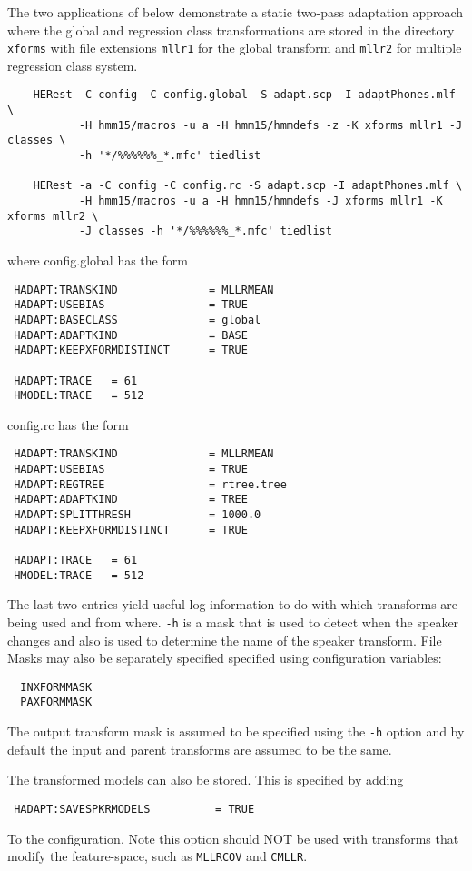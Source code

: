 The two applications of  below demonstrate a static two-pass 
adaptation approach where the global and regression class transformations are 
stored in the directory \texttt{xforms} with file extensions \texttt{mllr1}
for the global transform and \texttt{mllr2} for multiple regression class
system.
\begin{verbatim}
    HERest -C config -C config.global -S adapt.scp -I adaptPhones.mlf \
           -H hmm15/macros -u a -H hmm15/hmmdefs -z -K xforms mllr1 -J classes \
           -h '*/%%%%%%_*.mfc' tiedlist

    HERest -a -C config -C config.rc -S adapt.scp -I adaptPhones.mlf \
           -H hmm15/macros -u a -H hmm15/hmmdefs -J xforms mllr1 -K xforms mllr2 \
           -J classes -h '*/%%%%%%_*.mfc' tiedlist
\end{verbatim}
where config.global has the form
\begin{verbatim}
 HADAPT:TRANSKIND              = MLLRMEAN
 HADAPT:USEBIAS                = TRUE
 HADAPT:BASECLASS              = global
 HADAPT:ADAPTKIND              = BASE
 HADAPT:KEEPXFORMDISTINCT      = TRUE

 HADAPT:TRACE   = 61
 HMODEL:TRACE   = 512
\end{verbatim}
 config.rc has the form
\begin{verbatim}
 HADAPT:TRANSKIND              = MLLRMEAN
 HADAPT:USEBIAS                = TRUE
 HADAPT:REGTREE                = rtree.tree
 HADAPT:ADAPTKIND              = TREE
 HADAPT:SPLITTHRESH            = 1000.0
 HADAPT:KEEPXFORMDISTINCT      = TRUE

 HADAPT:TRACE   = 61
 HMODEL:TRACE   = 512
\end{verbatim}
The last two entries yield useful log information to do with which
transforms are being used and from where.  \texttt{-h} is a mask that
is used to detect when the speaker changes and also is used to
determine the name of the speaker transform. File Masks may also be 
separately specified specified using configuration variables:
\begin{verbatim}
  INXFORMMASK
  PAXFORMMASK
\end{verbatim}
The output transform mask is assumed to be specified using the {\tt -h} option
and by default the input and parent transforms are assumed to be the same.

The transformed models can also be stored. This is specified by adding
\begin{verbatim}
 HADAPT:SAVESPKRMODELS          = TRUE
\end{verbatim}
To the configuration. Note this option should NOT be used with
transforms that modify the feature-space, such as {\tt MLLRCOV} and
{\tt CMLLR}.

